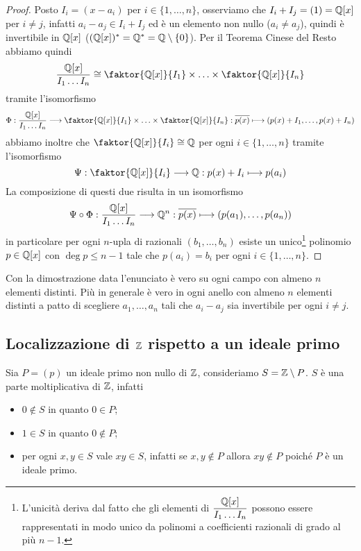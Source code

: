 \documentclass[11pt]{scrartcl}
\begin{document}
\begin{proof}
    Posto $I_i = (x - a_i)$ per $i \in \{1, \ldots, n\}$, osserviamo che 
    $I_i + I_j = (1) = \mathbb Q[x]$ per $i \neq j$, infatti $a_i - a_j \in I_i + I_j$ ed è un elemento non nullo ($a_i \neq a_j$),
    quindi è invertibile in $\mathbb Q[x]$ ($(\mathbb Q[x])^* = \mathbb Q^* = \mathbb Q \setminus \{0\}$). Per il Teorema Cinese del Resto
    abbiamo quindi
    \[
        \frac{\QQ[x]}{I_1\ldots I_n} \cong \faktor{\QQ[x]}{I_1}\times 
        \ldots \times \faktor{\QQ[x]}{I_n}
    \]
    tramite l'isomorfismo
    \[
        \Phi: \frac{\QQ[x]}{I_1\ldots I_n} \longrightarrow \faktor{\QQ[x]}{I_1}\times 
        \ldots \times \faktor{\QQ[x]}{I_n}: \overline{p(x)}\longmapsto
        (p(x) + I_1, \ldots, p(x) + I_n)
    \]
    abbiamo inoltre che $\faktor{\QQ[x]}{I_i} \cong \QQ$ per ogni $i \in \{1, \ldots, n\}$
    tramite l'isomorfismo
    \[
        \Psi: \faktor{\QQ[x]}{I_i} \longrightarrow \QQ: p(x) + I_i \longmapsto p(a_i)
    \]
    La composizione di questi due risulta in un isomorfismo
    \[
        \Psi\circ\Phi: \frac{\mathbb Q[x]}{I_1\ldots I_n}\longrightarrow \mathbb Q^n:
        \overline{p(x)}\longmapsto (p(a_1), \ldots, p(a_n))
    \]
    in particolare per ogni $n$-upla di razionali $(b_1, \ldots, b_n)$ esiste
    un unico\footnote{
        L'unicità deriva dal fatto che gli elementi di $\displaystyle\frac{\mathbb Q[x]}{I_1\ldots I_n}$
        possono essere rappresentati in modo unico da polinomi a coefficienti 
        razionali di grado al più $n - 1$.
    } polinomio $p \in \mathbb Q[x]$ con $\deg p \leq n - 1$ tale che 
    $p(a_i) = b_i$ per ogni $i \in \{1, \ldots, n\}$.
\end{proof}

\begin{remark}
    Con la dimostrazione data l'enunciato è vero su ogni campo con almeno 
    $n$ elementi distinti. Più in generale è vero in ogni anello con almeno $n$
    elementi distinti a patto di scegliere $a_1, \ldots, a_n$ tali che $a_i - a_j$
    sia invertibile per ogni $i \neq j$.
\end{remark}

\newpage

\subsection{Localizzazione di $\mathbb Z$ rispetto a un ideale primo}

Sia $P = (p)$ un ideale primo non nullo di $\mathbb Z$, consideriamo $S = \mathbb Z \setminus P$.
$S$ è una parte moltiplicativa di $\mathbb Z$, infatti
\begin{itemize}
    \item $0 \notin S$ in quanto $0 \in P$;
    \item $1 \in S$ in quanto $0 \notin P$;
    \item per ogni $x, y \in S$ vale $xy \in S$, infatti se $x, y \notin P$
    allora $xy \notin P$ poiché $P$ è un ideale primo.
\end{itemize}
\end{document}

